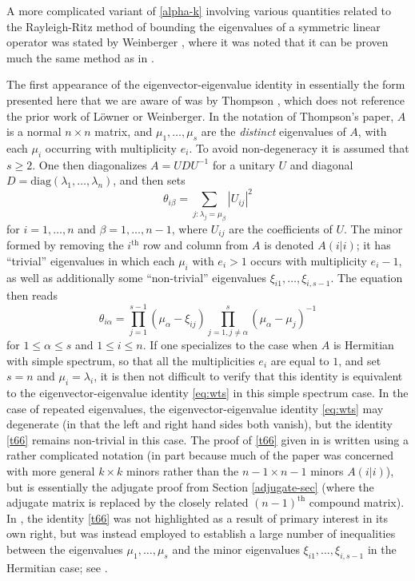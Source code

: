 \documentclass{amsart}
\begin{document}
A more complicated variant of \eqref{alpha-k} involving various quantities related to the Rayleigh-Ritz method of bounding the eigenvalues of a symmetric linear operator was stated by Weinberger \cite[(2.29)]{weinberger}, where it was noted that it can be proven much the same method as in \cite{Lowner}.  

The first appearance of the eigenvector-eigenvalue identity in essentially the form presented here that we are aware of was by Thompson \cite[(15)]{Thompson:1966}, which does not reference the prior work of L\"owner or Weinberger.  In the notation of Thompson's paper, $A$ is a normal $n \times n$ matrix, and $\mu_1,\dots,\mu_s$ are the \emph{distinct} eigenvalues of $A$, with each $\mu_i$ occurring with multiplicity $e_i$.  To avoid non-degeneracy it is assumed that $s \geq 2$.	One then diagonalizes $A = UDU^{-1}$ for a unitary $U$ and diagonal $D = \mathrm{diag}(\lambda_1,\dots,\lambda_n)$, and then sets
$$ \theta_{i\beta} = \sum_{j: \lambda_j = \mu_\beta} |U_{ij}|^2$$
for $i=1,\dots,n$ and $\beta=1,\dots,n-1$, where $U_{ij}$ are the coefficients of $U$. The minor formed by removing the $i^{\mathrm{th}}$ row and column from $A$ is denoted $A(i|i)$; it has ``trivial'' eigenvalues in which each $\mu_i$ with $e_i>1$ occurs with multiplicity $e_i-1$, as well as additionally some ``non-trivial'' eigenvalues $\xi_{i1},\dots,\xi_{i,s-1}$.  The equation \cite[(15)]{Thompson:1966} then reads
\begin{equation}\label{t66}
 \theta_{i\alpha} = \prod_{j=1}^{s-1} (\mu_\alpha - \xi_{ij}) \prod_{j=1,j \neq \alpha}^s (\mu_\alpha - \mu_j)^{-1}
\end{equation}
for $1 \leq \alpha \leq s$ and $1 \leq i \leq n$.  If one specializes to the case when $A$ is Hermitian with simple spectrum, so that all the multiplicities $e_i$ are equal to $1$, and set $s=n$ and $\mu_i = \lambda_i$, it is then not difficult to verify that this identity is equivalent to the eigenvector-eigenvalue identity \eqref{eq:wts} in this simple spectrum case. In the case of repeated eigenvalues, the eigenvector-eigenvalue identity \eqref{eq:wts} may degenerate (in that the left and right hand sides both vanish), but the identity \eqref{t66} remains non-trivial in this case.  The proof of \eqref{t66} given in \cite{Thompson:1966} is written using a rather complicated notation (in part because much of the paper was concerned with more general $k \times k$ minors rather than the $n-1 \times n-1$ minors $A(i|i)$), but is essentially the adjugate proof from Section \ref{adjugate-sec} (where the adjugate matrix is replaced by the closely related $(n-1)^{\mathrm{th}}$ compound matrix).  In \cite{Thompson:1966}, the identity \eqref{t66} was not highlighted as a result of primary interest in its own right, but was instead employed to establish a large number of inequalities between the eigenvalues $\mu_1,\dots,\mu_s$ and the minor eigenvalues $\xi_{i1},\dots,\xi_{i,s-1}$ in the Hermitian case; see \cite[Section 5]{Thompson:1966}.
\end{document}
